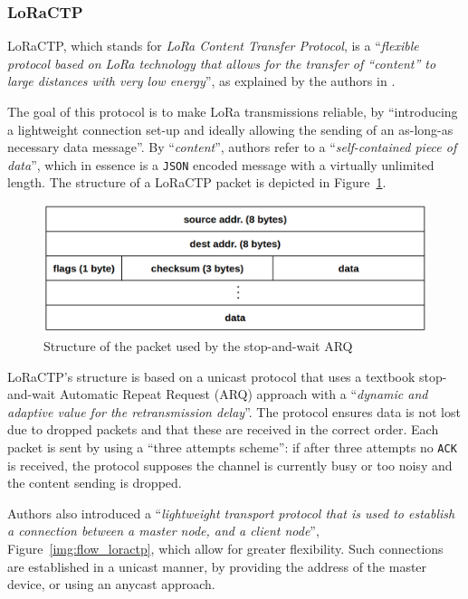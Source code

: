			\subsubsection{LoRaCTP}\label{subsec:loractp}
				
				LoRaCTP, which stands for \textit{LoRa Content Transfer Protocol}, is a ``\textit{flexible protocol based on LoRa technology that allows for the transfer of ``content'' to large distances with very low energy}'', as explained by the authors in \cite{loractp}.
				
				The goal of this protocol is to make LoRa transmissions reliable, by ``introducing a lightweight connection set-up and ideally allowing the sending of an as-long-as necessary data message''.
				By ``\textit{content}'', authors refer to a ``\textit{self-contained piece of data}'', which in essence is a \texttt{JSON} encoded message with a virtually unlimited length.
				The structure of a LoRaCTP packet is depicted in Figure~\ref{img:loractp_packet}.
			
				\begin{figure}[h]
					\centering
					\includegraphics[width=.75\textwidth]{resources/img/chap4/loractp_packet}
					\caption[Structure of the packet used by the stop-and-wait ARQ]{Structure of the packet used by the stop-and-wait ARQ \cite{loractp}}
					\label{img:loractp_packet}
				\end{figure}
				
				LoRaCTP's structure is based on a unicast protocol that uses a textbook stop-and-wait Automatic Repeat Request (ARQ) approach with a ``\textit{dynamic and adaptive value for the retransmission delay}''. 
				The protocol ensures data is not lost due to dropped packets and that these are received in the correct order.
				Each packet is sent by using a ``three attempts scheme'': if after three attempts no \texttt{ACK} is received, the protocol supposes the channel is currently busy or too noisy and the content sending is dropped.

				Authors also introduced a ``\textit{lightweight transport protocol that is used to establish a connection between a master node, and a client node}'', Figure~\ref{img:flow_loractp}, which allow for greater flexibility.
				Such connections are established in a unicast manner, by providing the address of the master device,
				or using an anycast approach.
				
